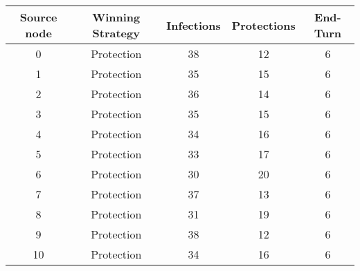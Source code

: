 \documentclass[results.tex]{subfiles}
\begin{document}
    \begin{center}
        \begin{tabular}{| c || c | c | c | c |}
            \hline
            {\bfseries Source node} & {\bfseries Winning Strategy} & {\bfseries Infections} & {\bfseries Protections}
            & {\bfseries End-Turn}
            \\  %
            \hline\hline
            0                       & Protection                   & 38                     & 12                      & 6                    \\
            \hline
            1                       & Protection                   & 35                     & 15                      & 6                    \\
            \hline
            2                       & Protection                   & 36                     & 14                      & 6                    \\
            \hline
            3                       & Protection                   & 35                     & 15                      & 6                    \\
            \hline
            4                       & Protection                   & 34                     & 16                      & 6                    \\
            \hline
            5                       & Protection                   & 33                     & 17                      & 6                    \\
            \hline
            6                       & Protection                   & 30                     & 20                      & 6                    \\
            \hline
            7                       & Protection                   & 37                     & 13                      & 6                    \\
            \hline
            8                       & Protection                   & 31                     & 19                      & 6                    \\
            \hline
            9                       & Protection                   & 38                     & 12                      & 6                    \\
            \hline
            10                      & Protection                   & 34                     & 16                      & 6                    \\

\end{tabular}
\end{center}
\end{document}
